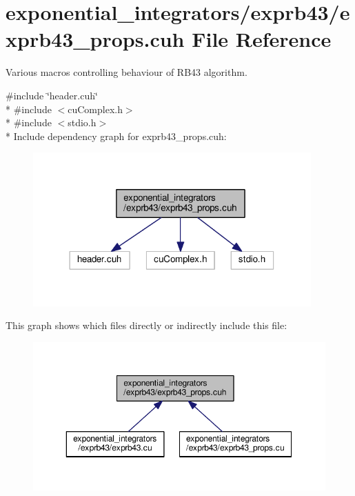 \hypertarget{exprb43__props_8cuh}{}\section{exponential\+\_\+integrators/exprb43/exprb43\+\_\+props.cuh File Reference}
\label{exprb43__props_8cuh}


Various macros controlling behaviour of R\+B43 algorithm.  


{\ttfamily \#include \char`\"{}header.\+cuh\char`\"{}}\\*
{\ttfamily \#include $<$cu\+Complex.\+h$>$}\\*
{\ttfamily \#include $<$stdio.\+h$>$}\\*
Include dependency graph for exprb43\+\_\+props.\+cuh\+:\nopagebreak
\begin{figure}[H]
\begin{center}
\leavevmode
\includegraphics[width=302pt]{exprb43__props_8cuh__incl}
\end{center}
\end{figure}
This graph shows which files directly or indirectly include this file\+:\nopagebreak
\begin{figure}[H]
\begin{center}
\leavevmode
\includegraphics[width=350pt]{exprb43__props_8cuh__dep__incl}
\end{center}
\end{figure}
